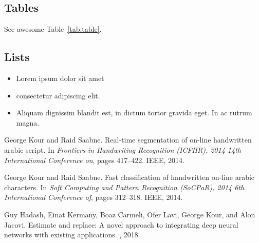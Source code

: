 \documentclass{article}
\begin{document}
\subsection{Tables}
\lipsum[12]
See awesome Table~\ref{tab:table}.

\subsection{Lists}
\begin{itemize}
\item Lorem ipsum dolor sit amet
\item consectetur adipiscing elit. 
\item Aliquam dignissim blandit est, in dictum tortor gravida eget. In ac rutrum magna.
\end{itemize}


  


\begin{thebibliography}{1}

George Kour and Raid Saabne.
\newblock Real-time segmentation of on-line handwritten arabic script.
\newblock In {\em Frontiers in Handwriting Recognition (ICFHR), 2014 14th
  International Conference on}, pages 417--422. IEEE, 2014.

George Kour and Raid Saabne.
\newblock Fast classification of handwritten on-line arabic characters.
\newblock In {\em Soft Computing and Pattern Recognition (SoCPaR), 2014 6th
  International Conference of}, pages 312--318. IEEE, 2014.

Guy Hadash, Einat Kermany, Boaz Carmeli, Ofer Lavi, George Kour, and Alon
  Jacovi.
\newblock Estimate and replace: A novel approach to integrating deep neural
  networks with existing applications.
, 2018.

\end{thebibliography}
\end{document}
